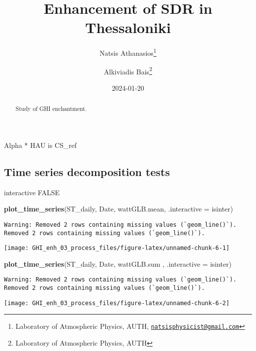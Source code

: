 \documentclass[
  10pt,
  a4paper,oneside]{article}
\title{Enhancement of SDR in Thessaloniki}
\author{Natsis Athanasios\footnote{Laboratory of Atmospheric Physics, AUTH, \href{mailto:natsisphysicist@gmail.com}{\nolinkurl{natsisphysicist@gmail.com}}} \and Alkiviadis Bais\footnote{Laboratory of Atmospheric Physics, AUTH}}
\date{2024-01-20}
\newenvironment{Shaded}{\begin{snugshade}}{\end{snugshade}}
\newcommand{\AttributeTok}[1]{\textcolor[rgb]{0.13,0.29,0.53}{#1}}
\newcommand{\FunctionTok}[1]{\textcolor[rgb]{0.13,0.29,0.53}{\textbf{#1}}}
\newcommand{\NormalTok}[1]{#1}
\begin{document}
\maketitle
\begin{abstract}
Study of GHI enchantment.
\end{abstract}

{
\hypersetup{linkcolor=}
\setcounter{tocdepth}{4}
\tableofcontents
}
Alpha * HAU is CS\_ref

\hypertarget{time-series-decomposition-tests}{%
\subsection{Time series decomposition tests}\label{time-series-decomposition-tests}}

interactive FALSE

\begin{Shaded}
\begin{Highlighting}[]
\FunctionTok{plot\_time\_series}\NormalTok{(ST\_daily, Date, wattGLB.mean, }\AttributeTok{.interactive =}\NormalTok{ isinter)}
\end{Highlighting}
\end{Shaded}

\begin{verbatim}
Warning: Removed 2 rows containing missing values (`geom_line()`).
Removed 2 rows containing missing values (`geom_line()`).
\end{verbatim}

\begin{center}\texttt{[image: GHI\_enh\_03\_process\_files/figure-latex/unnamed-chunk-6-1]} \end{center}

\begin{Shaded}
\begin{Highlighting}[]
\FunctionTok{plot\_time\_series}\NormalTok{(ST\_daily, Date, wattGLB.sum , }\AttributeTok{.interactive =}\NormalTok{ isinter)}
\end{Highlighting}
\end{Shaded}

\begin{verbatim}
Warning: Removed 2 rows containing missing values (`geom_line()`).
Removed 2 rows containing missing values (`geom_line()`).
\end{verbatim}

\begin{center}\texttt{[image: GHI\_enh\_03\_process\_files/figure-latex/unnamed-chunk-6-2]} \end{center}
\end{document}
